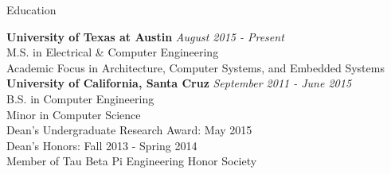 \documentclass{resume} %
\begin{document}

\begin{rSection}{Education}

{\bf University of Texas at Austin} \hfill {\em August 2015 - Present} \\ 
M.S. in Electrical \& Computer Engineering \\
Academic Focus in Architecture, Computer Systems, and Embedded Systems \\

{\bf University of California, Santa Cruz} \hfill {\em September 2011 - June 2015} \\ 
B.S. in Computer Engineering \\
Minor in Computer Science \\
Dean's Undergraduate Research Award: May 2015 \\
Dean's Honors: Fall 2013 - Spring 2014 \\
Member of Tau Beta Pi Engineering Honor Society \\

\end{rSection}

\end{document}
